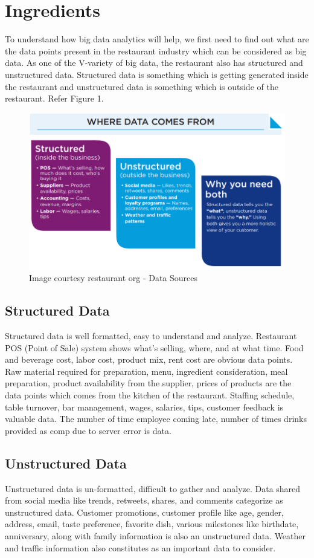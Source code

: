 \documentclass[sigconf]{acmart}
\begin{document}
\section{Ingredients}
To understand how big data analytics will help, we first need to find out what are the data points present in the restaurant industry which can be considered as big data. As one of the V-variety of big data, the restaurant also has structured and unstructured data. Structured data is something which is getting generated inside the restaurant and unstructured data is something which is outside of the restaurant. Refer Figure 1.
\begin{figure}
\includegraphics{images/datasource}
\caption{Image courtesy restaurant org - Data Sources}
\end{figure}

\subsection{Structured Data}
Structured data is well formatted, easy to understand and analyze. Restaurant POS (Point of Sale) system shows what's selling, where, and at what time\cite{www-qsr}. Food and beverage cost, labor cost, product mix, rent cost are obvious data points. Raw material required for preparation, menu, ingredient consideration, meal preparation, product availability from the supplier, prices of products are the data points which comes from the kitchen of the restaurant. Staffing schedule, table turnover, bar management, wages, salaries, tips, customer feedback is valuable data. The number of time employee coming late, number of times drinks provided as comp due to server error is data\cite{www-restaurant}.
\subsection{Unstructured Data}
Unstructured data is un-formatted, difficult to gather and analyze. Data shared from social media like trends, retweets, shares, and comments categorize as unstructured data. Customer promotions, customer profile like age, gender, address, email, taste preference, favorite dish, various milestones like birthdate, anniversary, along with family information is also an unstructured data. Weather and traffic information also constitutes as an important data to consider\cite{www-restaurant}. 
\end{document}
